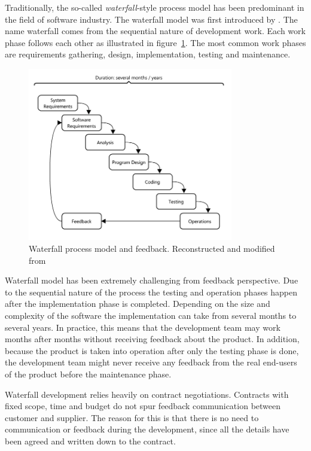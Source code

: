 \documentclass[english,12pt,a4paper,pdftex]{article}
\begin{document}
Traditionally, the so-called \emph{waterfall}-style process model has been predominant in the field of software industry. The waterfall model was first introduced by \citet{royce1970}. The name waterfall comes from the sequential nature of development work. Each work phase follows each other as illustrated in figure~\ref{fig:waterfall}. The most common work phases are requirements gathering, design, implementation, testing and maintenance.


\begin{figure}[htb]
\begin{center}
\includegraphics[width=0.8\textwidth]{waterfall_reconstructed.png}
\end{center}
\caption{Waterfall process model and feedback. Reconstructed and modified from \citet{royce1970}}
\label{fig:waterfall}
\end{figure}


Waterfall model has been extremely challenging from feedback perspective. Due to the sequential nature of the process the testing and operation phases happen after the implementation phase is completed. Depending on the size and complexity of the software the implementation can take from several months to several years. In practice, this means that the development team may work months after months without receiving feedback about the product. In addition, because the product is taken into operation after only the testing phase is done, the development team might never receive any feedback from the real end-users of the product before the maintenance phase.

Waterfall development relies heavily on contract negotiations. Contracts with fixed scope, time and budget do not spur feedback communication between customer and supplier. The reason for this is that there is no need to communication or feedback during the development, since all the details have been agreed and written down to the contract. 
\end{document}
